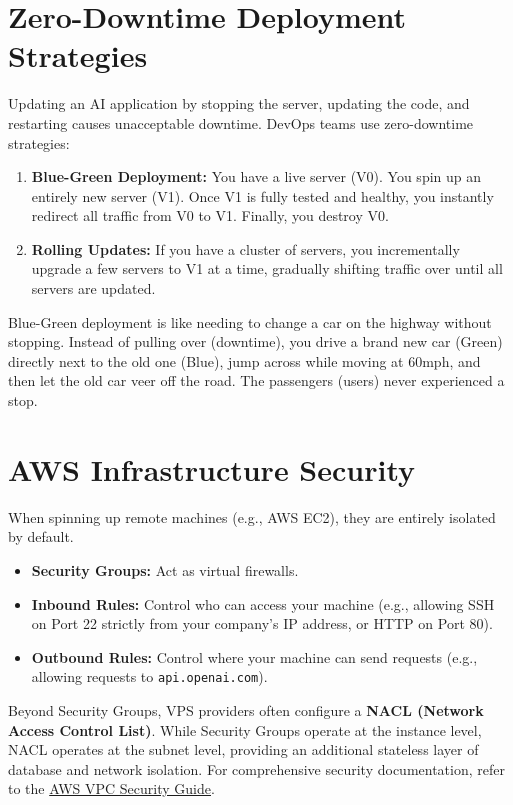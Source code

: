 \documentclass[12pt,a4paper,oneside]{book}
\begin{document}
\section{Zero-Downtime Deployment Strategies}
Updating an AI application by stopping the server, updating the code, and restarting causes unacceptable downtime. DevOps teams use zero-downtime strategies:

\begin{enumerate}
	\item \textbf{Blue-Green Deployment:} You have a live server (V0). You spin up an entirely new server (V1). Once V1 is fully tested and healthy, you instantly redirect all traffic from V0 to V1. Finally, you destroy V0.
	\item \textbf{Rolling Updates:} If you have a cluster of servers, you incrementally upgrade a few servers to V1 at a time, gradually shifting traffic over until all servers are updated.
\end{enumerate}

\begin{tipbox}
	Blue-Green deployment is like needing to change a car on the highway without stopping. Instead of pulling over (downtime), you drive a brand new car (Green) directly next to the old one (Blue), jump across while moving at 60mph, and then let the old car veer off the road. The passengers (users) never experienced a stop.
\end{tipbox}

\section{AWS Infrastructure Security}
When spinning up remote machines (e.g., AWS EC2), they are entirely isolated by default.
\begin{itemize}
	\item \textbf{Security Groups:} Act as virtual firewalls.
	\item \textbf{Inbound Rules:} Control who can access your machine (e.g., allowing SSH on Port 22 strictly from your company's IP address, or HTTP on Port 80).
	\item \textbf{Outbound Rules:} Control where your machine can send requests (e.g., allowing requests to \texttt{api.openai.com}).
\end{itemize}

Beyond Security Groups, VPS providers often configure a \textbf{NACL (Network Access Control List)}. While Security Groups operate at the instance level, NACL operates at the subnet level, providing an additional stateless layer of database and network isolation. For comprehensive security documentation, refer to the \href{https://docs.aws.amazon.com/vpc/latest/userguide/VPC_Security.html}{AWS VPC Security Guide}.
\end{document}
